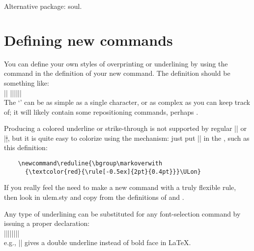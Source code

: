 \documentclass[12pt]{ltxdoc}
\begin{document}
Alternative package: soul.

\section{Defining new commands}

You can define your own styles of overprinting or underlining by using
the  command in the definition of your new command.
The definition should be something like:\\[3pt]
\indent
 |{| |{||}||}|\\[3pt]
The `' can be as simple as a single character, or as complex as
you can keep track of; it will likely contain some repositioning commands, perhaps
.

Producing a colored underline or strike-through is not supported by
regular |\uline| or |\sout|, but it is quite easy to colorize using 
the  mechanism: just put |\textcolor{|\dots|}| in 
the , such as this definition:
\begin{verbatim}
    \newcommand\reduline{\bgroup\markoverwith
      {\textcolor{red}{\rule[-0.5ex]{2pt}{0.4pt}}}\ULon}
\end{verbatim}
If you really feel the need to make a new command with a truly 
flexible rule, then look in ulem.sty and copy from the definitions
of  and .

Any type of underlining can be substituted for any font-selection command
by issuing a proper  declaration:\\[3pt]
 |{||}{||}{||}|\\[3pt]
e.g., |\useunder{\uuline}{\bfseries}{\textbf}| gives a double underline
instead of bold face in \LaTeX. 
\end{document}
